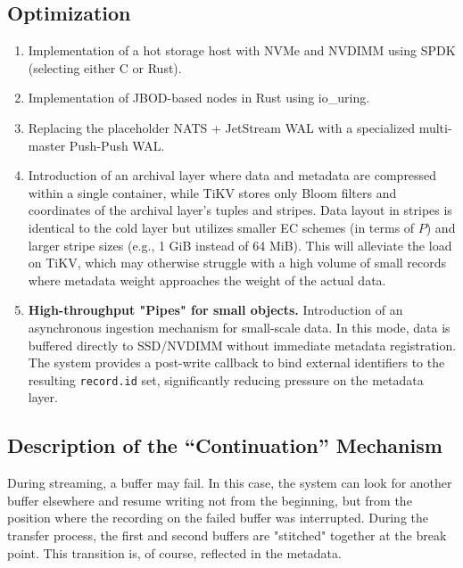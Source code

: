 \documentclass[a4paper,12pt]{article}
\begin{document}
    \subsection{Optimization}
    \begin{enumerate}
        \item Implementation of a hot storage host with NVMe and NVDIMM using SPDK (selecting either C or Rust).
        \item Implementation of JBOD-based nodes in Rust using io\_uring.
        \item Replacing the placeholder NATS + JetStream WAL with a specialized multi-master Push-Push WAL.
        \item Introduction of an archival layer where data and metadata are compressed within a single container, while TiKV stores only Bloom filters and coordinates of the archival layer's tuples and stripes. Data layout in stripes is identical to the cold layer but utilizes smaller EC schemes (in terms of $P$) and larger stripe sizes (e.g., 1 GiB instead of 64 MiB). This will alleviate the load on TiKV, which may otherwise struggle with a high volume of small records where metadata weight approaches the weight of the actual data.
        \item \textbf{High-throughput "Pipes" for small objects.}
        Introduction of an asynchronous ingestion mechanism for small-scale data. In this mode,
        data is buffered directly to SSD/NVDIMM without immediate metadata registration.
        The system provides a post-write callback to bind external identifiers to the
        resulting \texttt{record.id} set, significantly reducing pressure on the metadata layer.

    \end{enumerate}

    \subsection{Description of the \enquote{Continuation} Mechanism}

    During streaming, a buffer may fail. In this case, the system can look for another buffer elsewhere and resume writing not from the beginning, but from the position where the recording on the failed buffer was interrupted. During the transfer process, the first and second buffers are "stitched" together at the break point. This transition is, of course, reflected in the metadata.
\end{document}
